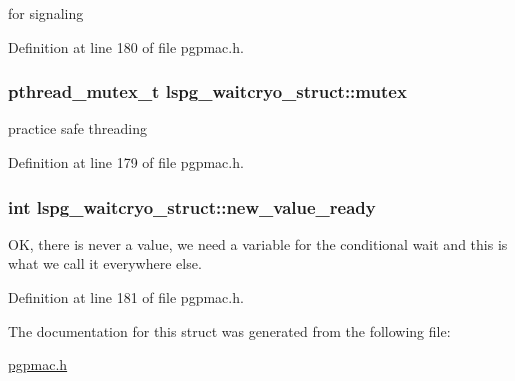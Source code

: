 for signaling 



Definition at line 180 of file pgpmac.\-h.

\hypertarget{structlspg__waitcryo__struct_a62b50ead380fc8a6be35956eba384ba6}{
\subsubsection[{mutex}]{\setlength{\rightskip}{0pt plus 5cm}pthread\-\_\-mutex\-\_\-t lspg\-\_\-waitcryo\-\_\-struct\-::mutex}}\label{structlspg__waitcryo__struct_a62b50ead380fc8a6be35956eba384ba6}


practice safe threading 



Definition at line 179 of file pgpmac.\-h.

\hypertarget{structlspg__waitcryo__struct_a97298b773fd8c1f2ef20159093a08246}{
\subsubsection[{new\-\_\-value\-\_\-ready}]{\setlength{\rightskip}{0pt plus 5cm}int lspg\-\_\-waitcryo\-\_\-struct\-::new\-\_\-value\-\_\-ready}}\label{structlspg__waitcryo__struct_a97298b773fd8c1f2ef20159093a08246}


O\-K, there is never a value, we need a variable for the conditional wait and this is what we call it everywhere else. 



Definition at line 181 of file pgpmac.\-h.



The documentation for this struct was generated from the following file\-:\begin{DoxyCompactItemize}
\item 
\hyperlink{pgpmac_8h}{pgpmac.\-h}\end{DoxyCompactItemize}
